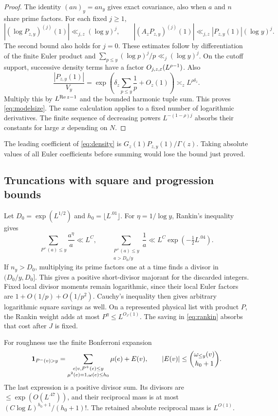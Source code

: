 \begin{proof}
The identity $(an)_y=an_y$ gives exact covariance, also when $a$ and
$n$ share prime factors. For each fixed $j\geq1$,
\[
 |(\log P_{z,y})^{(j)}(1)|\ll_{j,z}(\log y)^j,\qquad
 |(A_zP_{z,y})^{(j)}(1)|\ll_{j,z}|P_{z,y}(1)|(\log y)^j.
\]
The second bound also holds for $j=0$.
These estimates follow by differentiation of the finite Euler
product and $\sum_{p\leq y}(\log p)^j/p\ll_j(\log y)^j$.
On the cutoff support, successive density terms have a factor
$O_{j,z,\varepsilon}(L^{\rho-1})$. Also
\[
 \frac{|P_{z,y}(1)|}{V_y}
 =\exp\left(\delta_z\sum_{p\leq y}\frac1p+O_z(1)\right)
 \asymp_z L^{\rho\delta_z}.
\]
Multiply this by $L^{\operatorname{Re} z-1}$ and the bounded harmonic tuple
sum. This proves \eqref{eq:modelsize}. The same calculation applies
to a fixed number of logarithmic derivatives. The finite sequence
of decreasing powers $L^{-(1-\rho)j}$ absorbs their constants for
large $x$ depending on $N$.
\end{proof}

The leading coefficient of \eqref{eq:density} is
$G_z(1)P_{z,y}(1)/\Gamma(z)$. Taking absolute values of all Euler
coefficients before summing would lose the bound just proved.

\subsection{Truncations with square and progression bounds}

Let $D_0=\exp(L^{1/2})$ and $h_0=\lfloor L^{.01}\rfloor$.
For $\eta=1/\log y$, Rankin's inequality gives
\begin{equation}\label{eq:rankin}
 \sum_{P^+(a)\leq y}\frac{a^\eta}{a}\ll L^C,
 \qquad
 \sum_{\substack{P^+(a)\leq y\\a>D_0/y}}\frac1a
 \ll L^C\exp(-\tfrac12L^{.04}).
\end{equation}
If $n_y>D_0$, multiplying its prime factors one at a time finds a
divisor in $(D_0/y,D_0]$. This gives a positive short-divisor
majorant for the discarded integers. Fixed local divisor moments
remain logarithmic, since their local Euler factors are
$1+O(1/p)+O(1/p^2)$. Cauchy's inequality then gives arbitrary
logarithmic square savings as well. On a represented physical list
with product $P$, the Rankin weight adds at most
$P^\eta\leq L^{O_J(1)}$. The saving in \eqref{eq:rankin} absorbs
that cost after $J$ is fixed.

For roughness use the finite Bonferroni expansion
\begin{equation}\label{eq:bonferroni}
 \mathbf 1_{P^-(v)>y}
 =\sum_{\substack{e\mid v, P^+(e)\leq y\\
                    \mu^2(e)=1, \omega(e)\leq h_0}}\mu(e)+E(v),
 \qquad |E(v)|\leq\binom{\omega_{\leq y}(v)}{h_0+1}.
\end{equation}
The last expression is a positive divisor sum. Its divisors are
$\leq\exp(O(L^{.47}))$, and their reciprocal mass is at most
$(C\log L)^{h_0+1}/(h_0+1)!$. The retained absolute reciprocal mass
is $L^{O(1)}$.

